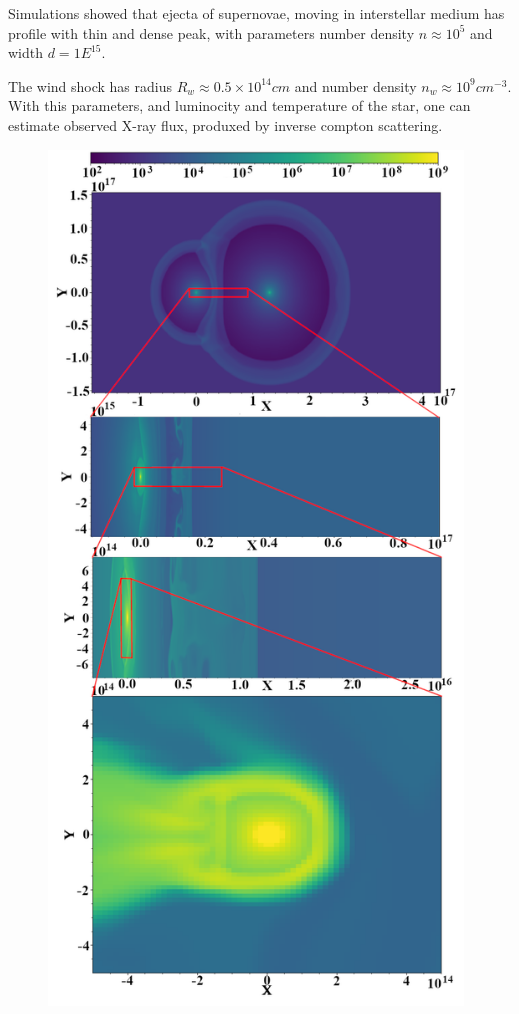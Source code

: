 \documentclass[a4paper,12pt]{extreport}
\begin{document}
Simulations showed that ejecta of supernovae, moving in interstellar medium has profile with thin and dense peak, with parameters number density $n \approx 10^5$ and width $d = 1E^{15}$.


The wind shock has radius $R_w \approx 0.5\times10^14 cm$ and number density $n_w \approx 10^9 cm^{-3}$. With this parameters, and luminocity and temperature of the star, one can estimate observed X-ray flux, produxed by inverse compton scattering.

\begin{figure}[h!]
	\centering
	\begin{minipage}{0.48\textwidth}
		\centering
		\includegraphics[width=0.98\textwidth]{./fig/density.png} 

\end{minipage}
\end{figure}
\end{document}
